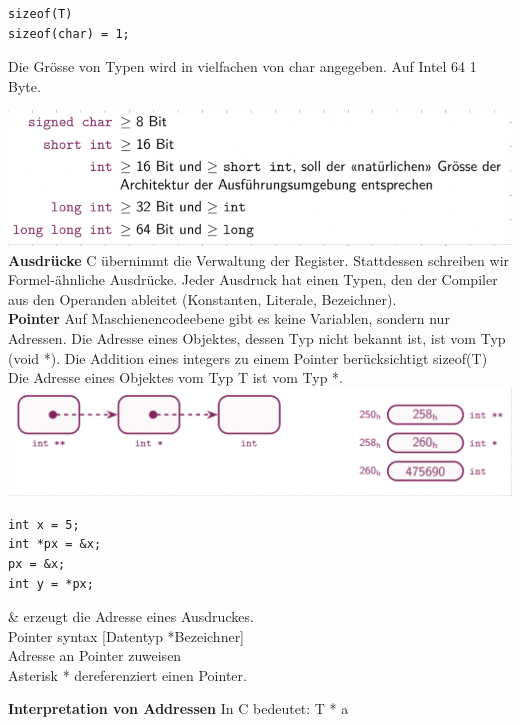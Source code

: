 \documentclass[7pt,landscape,a4paper]{scrartcl}
\begin{document}
\begin{multicols*}{4}
\begin{minipage}[b]{0,5\linewidth}
\begin{verbatim}
sizeof(T) 
sizeof(char) = 1;
\end{verbatim}
\end{minipage}
\begin{minipage}[b]{0,5\linewidth}
Die Grösse von Typen wird in vielfachen von char angegeben. Auf Intel 64 1 Byte.
\end{minipage}
\includegraphics[width=\linewidth]{basistypen}
\textbf{Ausdrücke}
C übernimmt die Verwaltung der Register. Stattdessen schreiben wir Formel-ähnliche Ausdrücke. Jeder Ausdruck hat einen Typen, den der Compiler aus den Operanden ableitet (Konstanten, Literale, Bezeichner).\\
\textbf{Pointer}
Auf Maschienencodeebene gibt es keine Variablen, sondern nur Adressen. Die Adresse eines Objektes, dessen Typ nicht bekannt ist, ist vom Typ (void *). Die Addition eines integers zu einem Pointer berücksichtigt sizeof(T)\\ 
Die Adresse eines Objektes vom Typ T ist vom Typ *.
\includegraphics[width=\linewidth]{pointer}
\begin{minipage}[b]{0,3\linewidth}
\begin{verbatim}
int x = 5;
int *px = &x;
px = &x;
int y = *px;
\end{verbatim}
\end{minipage}
\begin{minipage}[b]{0,65\linewidth}
\& erzeugt die Adresse eines Ausdruckes.\\
Pointer syntax [Datentyp *Bezeichner]\\
Adresse an Pointer zuweisen\\
Asterisk * dereferenziert einen Pointer.
\end{minipage}
\textbf{Interpretation von Addressen} In C bedeutet: T * a\\

\end{multicols*}
\end{document}
